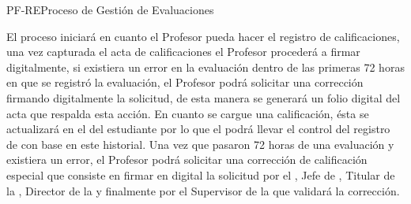 \begin{Proceso}{PF-RE}{Proceso de Gestión de Evaluaciones}{
        El proceso iniciará en cuanto el Profesor pueda hacer el registro de calificaciones, una vez capturada el acta de calificaciones el Profesor procederá a firmar digitalmente, si existiera un error en la evaluación dentro de las primeras 72 horas en que se registró la evaluación, el Profesor podrá solicitar una corrección firmando digitalmente la solicitud, de esta manera se generará un folio digital del acta que respalda esta acción. En cuanto se cargue una calificación, ésta se actualizará en el  del estudiante por lo que el  podrá llevar el control del registro de  con base en este historial. Una vez que pasaron 72 horas de una evaluación y existiera un error, el Profesor podrá solicitar una corrección de calificación especial que consiste en firmar en digital la solicitud por el , Jefe de , Titular de la , Director de la  y finalmente por el Supervisor de la  que validará la corrección.

}
\end{Proceso}
